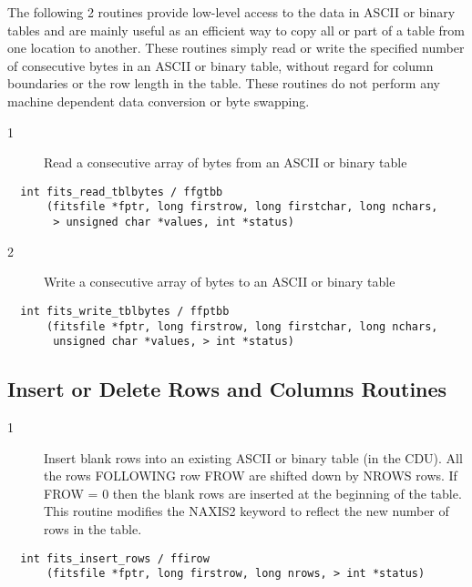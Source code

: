 The following 2 routines provide low-level access to the data in ASCII
or binary tables and are mainly useful as an efficient way to copy all
or part of a table from one location to another.  These routines simply
read or write the specified number of consecutive bytes in an ASCII or
binary table, without regard for column boundaries or the row length in
the table.  These routines do not perform any machine dependent data
conversion or byte swapping.


\begin{description}
\item[1 ] Read a consecutive array of bytes from an ASCII or binary table
\end{description}

\begin{verbatim}
  int fits_read_tblbytes / ffgtbb
      (fitsfile *fptr, long firstrow, long firstchar, long nchars,
       > unsigned char *values, int *status)
\end{verbatim}

\begin{description}
\item[2 ] Write a consecutive array of bytes to an ASCII or binary table
\end{description}

\begin{verbatim}
  int fits_write_tblbytes / ffptbb
      (fitsfile *fptr, long firstrow, long firstchar, long nchars,
       unsigned char *values, > int *status)
\end{verbatim}

\subsection{ Insert or Delete Rows and Columns Routines \label{FFIROW}}


\begin{description}
\item[1 ] Insert blank rows into an existing ASCII or binary table (in the CDU).
    All the rows FOLLOWING row FROW are shifted down by NROWS rows.  If
    FROW = 0 then the blank rows are inserted at the beginning of the
    table.  This routine modifies the NAXIS2 keyword to reflect the new
   number of rows in the table.
\end{description}

\begin{verbatim}
  int fits_insert_rows / ffirow
      (fitsfile *fptr, long firstrow, long nrows, > int *status)
\end{verbatim}

